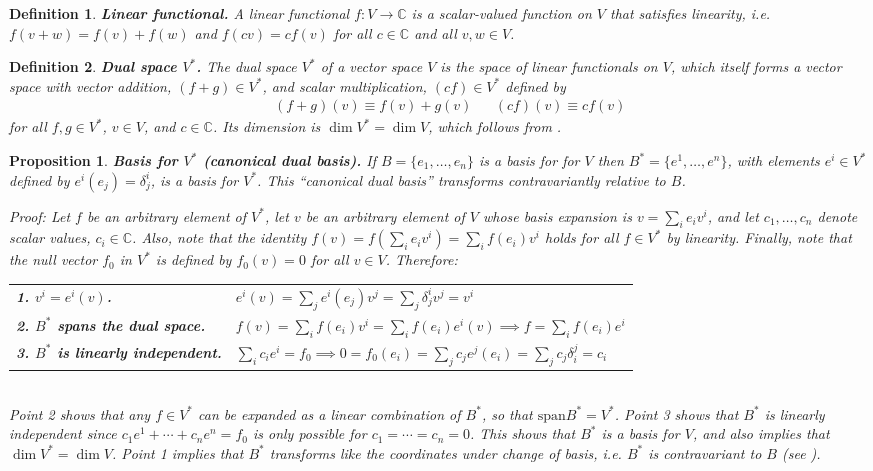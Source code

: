 \documentclass[11pt,fleqn]{article}
\renewcommand{\d}{\delta}    %
\newcommand{\spn}{\ensuremath{\mathrm{span}}}
\newcommand{\ld}{\ensuremath{\ldots}}
\newcommand{\cd}{\ensuremath{\cdots}}
\newcommand{\bmit}[1]{{\bfseries\itshape\mathversion{bold}#1}}
\newcommand{\mb}[1]{\ensuremath{\mathbb{#1}}}
\newcommand{\ts}{\textstyle}
\newcommand{\pr}[1]{\ensuremath{\left(#1\right)}}
\theoremstyle{mystyle}
\newtheorem{dfn}{Definition}
\newtheorem{pro}{Proposition}
\numberwithin{equation}{section}
\begin{document}
\begin{dfn}
\label{linear-functionals}
\bmit{Linear functional.}
A \textit{linear functional} $f:V\rightarrow\mb{C}$ is a scalar-valued function on $V$ that satisfies linearity, i.e. $f(v+w)=f(v)+f(w)$ and $f(cv)=cf(v)$ for all $c\in\mb{C}$ and all $v,w\in V$.
\end{dfn}

\begin{dfn}
\label{dual-space}
\bmit{Dual space $V^*$.}
The \textit{dual space} $V^*$ of a vector space $V$ is the space of linear functionals on $V$, which itself forms a vector space with vector addition, $(f+g)\in V^*$, and scalar multiplication, $(cf)\in V^*$ defined by 
\begin{align*}
&&
  (f+g)(v)
\equiv
  f(v)+g(v)
&&
  (cf)(v)
\equiv
  cf(v)
\end{align*}
for all $f,g\in V^*$, $v\in V$, and $c\in\mb{C}$.
Its dimension is $\dim V^*=\dim V$, which follows from .
\end{dfn}


\begin{pro}
\label{dual-basis}
\bmit{Basis for $V^*$ (canonical dual basis).}
\textit{If $B=\{e_1,\ld,e_n\}$ is a basis for for $V$ then $B^*=\{e^1,\ld,e^n\}$, with elements $e^i\in V^*$ defined by $e^i(e_j)=\d_j^i$, is a basis for $V^*$.  This ``canonical dual basis'' transforms contravariantly relative to $B$.}
\begin{addmargin}[1em]{0em}
Proof: Let $f$ be an arbitrary element of $V^*$, let $v$ be an arbitrary element of $V$ whose basis expansion is $v=\sum_i e_iv^i$, and let $c_1,\ld,c_n$ denote scalar values, $c_i\in\mb{C}$.
Also, note that the identity $f(v)=f\pr{\ts\sum_ie_iv^i}=\sum_i f(e_i)v^i$ holds for all $f\in V^*$ by linearity.
Finally, note that the null vector $f_0$ in $V^*$ is defined by $f_0(v)=0$ for all $v\in V$.
Therefore:
\\[5pt]
\begin{tabular}{ll}
\bmit{1. $v^i=e^i(v)$.} &
$e^i(v)=\sum_je^i(e_j)v^j=\sum_j\d_j^iv^j=v^i$
\\[5pt]
\bmit{2. $B^*$ spans the dual space.} &
$f(v)=\sum_i f(e_i)v^i=\sum_i f(e_i)e^i(v)\implies f=\sum_if(e_i)e^i$
\\[5pt]
\bmit{3. $B^*$ is linearly independent.} &
$\sum_i c_ie^i=f_0\implies 0=f_0(e_i)=\sum_jc_je^j(e_i)=\sum_jc_j\d_i^j=c_i$
\end{tabular}
\\[5pt]
Point 2 shows that any $f\in V^*$ can be expanded as a linear combination of $B^*$, so that $\spn B^*=V^*$.
Point 3 shows that $B^*$ is linearly independent since $c_1e^1+\cd+c_ne^n=f_0$ is only possible for $c_1=\cd=c_n=0$.
This shows that $B^*$ is a basis for $V$, and also implies that $\dim V^*=\dim V$.
Point 1 implies that $B^*$ transforms like the coordinates under change of basis, i.e. $B^*$ is contravariant to $B$ (see ).
\end{addmargin}
\end{pro}
\end{document}
